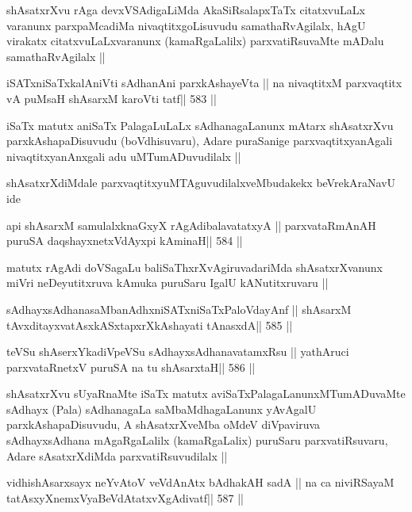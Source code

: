 \begin{artha}
shAsatxrXvu rAga devxVSAdigaLiMda AkaSiRsalapxTaTx citatxvuLaLx
varanunx parxpaMcadiMa nivaqtitxgoLisuvudu samathaRvAgilalx, hAgU
virakatx citatxvuLaLxvaranunx (kamaRgaLalilx) parxvatiRsuvaMte mADalu
samathaRvAgilalx ||
\end{artha}

\begin{shl}
iSATxniSaTxkalAniVti sAdhanAni parxkAshayeVta ||
na nivaqtitxM parxvaqtitx vA puMsaH shAsarxM karoVti tatf\hfill || 583 ||
\end{shl}

\begin{artha}
iSaTx matutx aniSaTx PalagaLuLaLx sAdhanagaLanunx mAtarx shAsatxrXvu
parxkAshapaDisuvudu (boVdhisuvaru), Adare puraSanige
parxvaqtitxyanAgali nivaqtitxyanAnxgali adu uMTumADuvudilalx ||

shAsatxrXdiMdale parxvaqtitxyuMTAguvudilalxveMbudakekx beVrekAraNavU ide
\end{artha}

\begin{shl}
api shAsarxM samulalxknaGxyX rAgAdibalavatatxyA ||
parxvataRmAnAH puruSA daqshayxnetxV\s dAyxpi kAminaH\hfill || 584 ||
\end{shl}

\begin{artha}
matutx rAgAdi doVSagaLu baliSaThxrXvAgiruvadariMda shAsatxrXvanunx
miVri neDeyutitxruva kAmuka puruSaru IgalU kANutitxruvaru ||
\end{artha}

\begin{shl}
sAdhayxsAdhanasaMbanAdhxniSATxniSaTxPaloVdayAnf ||
shAsarxM tAvxditayxvatAsxkASxtapxrXkAshayati tAnasxdA\hfill || 585 ||
\end{shl}

\begin{shl}
teVSu shAserxYkadiVpeVSu sAdhayxsAdhanavatamxRsu ||
yathAruci parxvataRnetxV puruSA na tu shAsarxtaH\hfill || 586 ||
\end{shl}

\begin{artha}
shAsatxrXvu sUyaRnaMte iSaTx matutx aviSaTxPalagaLanunxMTumADuvaMte
sAdhayx (Pala) sAdhanagaLa saMbaMdhagaLanunx yAvAgalU
parxkAshapaDisuvudu, A shAsatxrXveMba oMdeV diVpaviruva sAdhayxsAdhana
mAgaRgaLalilx (kamaRgaLalix) puruSaru parxvatiRsuvaru, Adare
sAsatxrXdiMda parxvatiRsuvudilalx ||
\end{artha}

\begin{shl}
vidhishAsarxsayx neYvAtoV veVdAnAtx bAdhakAH sadA ||
na ca niviRSayaM tatAsxyXnemxVyaBeVdAtatxvXgAdivatf\hfill || 587 ||
\end{shl}

